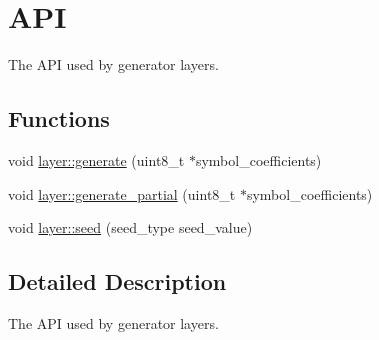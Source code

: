 \hypertarget{group__coefficient__generator__api}{\section{A\-P\-I}
\label{group__coefficient__generator__api}
}


The A\-P\-I used by generator layers.  


\subsection*{Functions}
\begin{DoxyCompactItemize}
\item 
void \hyperlink{group__coefficient__generator__api_gaf9f828a98483445a8ccf785e3a671cb3}{layer\-::generate} (uint8\-\_\-t $\ast$symbol\-\_\-coefficients)
\item 
void \hyperlink{group__coefficient__generator__api_ga295e2fc5a74a92ef2281549a31379ba5}{layer\-::generate\-\_\-partial} (uint8\-\_\-t $\ast$symbol\-\_\-coefficients)
\begin{DoxyCompactList}\small\item\em \end{DoxyCompactList}\item 
void \hyperlink{group__coefficient__generator__api_ga4afaaccc0d847e2c8ba021cc4e8c9672}{layer\-::seed} (seed\-\_\-type seed\-\_\-value)
\end{DoxyCompactItemize}


\subsection{Detailed Description}
The A\-P\-I used by generator layers. 

